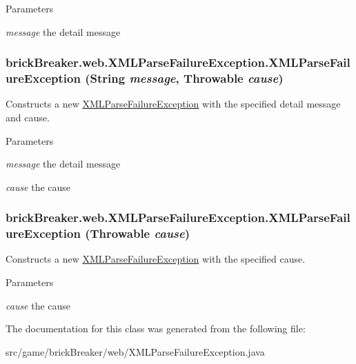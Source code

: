 \begin{DoxyParams}{Parameters}
\item[{\em message}]the detail message \end{DoxyParams}
\hypertarget{classbrick_breaker_1_1web_1_1_x_m_l_parse_failure_exception_a481f9e2823e591526dddb632a3cb8ab7}{
\subsubsection[{XMLParseFailureException}]{\setlength{\rightskip}{0pt plus 5cm}brickBreaker.web.XMLParseFailureException.XMLParseFailureException (String {\em message}, \/  Throwable {\em cause})}}
\label{classbrick_breaker_1_1web_1_1_x_m_l_parse_failure_exception_a481f9e2823e591526dddb632a3cb8ab7}
Constructs a new {\ttfamily \hyperlink{classbrick_breaker_1_1web_1_1_x_m_l_parse_failure_exception}{XMLParseFailureException}} with the specified detail message and cause.


\begin{DoxyParams}{Parameters}
\item[{\em message}]the detail message \item[{\em cause}]the cause \end{DoxyParams}
\hypertarget{classbrick_breaker_1_1web_1_1_x_m_l_parse_failure_exception_aa07904b5ff321a28d6ed9669236fa98b}{
\subsubsection[{XMLParseFailureException}]{\setlength{\rightskip}{0pt plus 5cm}brickBreaker.web.XMLParseFailureException.XMLParseFailureException (Throwable {\em cause})}}
\label{classbrick_breaker_1_1web_1_1_x_m_l_parse_failure_exception_aa07904b5ff321a28d6ed9669236fa98b}
Constructs a new {\ttfamily \hyperlink{classbrick_breaker_1_1web_1_1_x_m_l_parse_failure_exception}{XMLParseFailureException}} with the specified cause.


\begin{DoxyParams}{Parameters}
\item[{\em cause}]the cause \end{DoxyParams}


The documentation for this class was generated from the following file:\begin{DoxyCompactItemize}
\item 
src/game/brickBreaker/web/XMLParseFailureException.java\end{DoxyCompactItemize}
